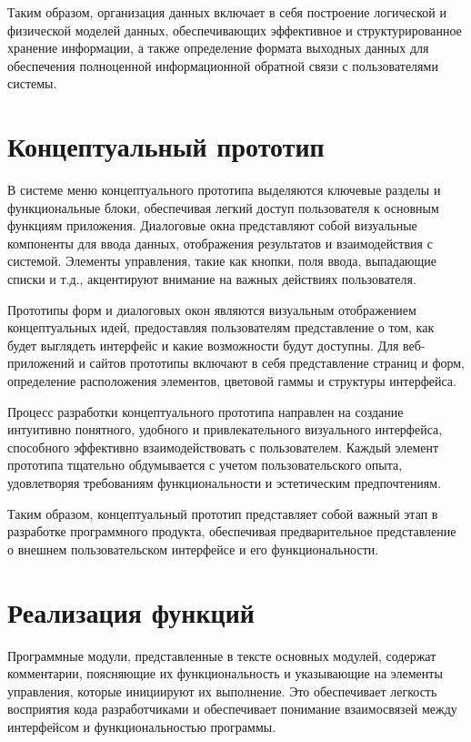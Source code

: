 \documentclass[12pt,a4paper,draft]{belgost/belgost}
\begin{document}
Таким образом, организация данных включает в себя построение логической и физической моделей данных, обеспечивающих эффективное и структурированное хранение информации, а также определение формата выходных данных для обеспечения полноценной информационной обратной связи с пользователями системы.

\section{Концептуальный прототип}

В системе меню концептуального прототипа выделяются ключевые разделы и функциональные блоки, обеспечивая легкий доступ пользователя к основным функциям приложения.
Диалоговые окна представляют собой визуальные компоненты для ввода данных, отображения результатов и взаимодействия с системой.
Элементы управления, такие как кнопки, поля ввода, выпадающие списки и т.д., акцентируют внимание на важных действиях пользователя.

Прототипы форм и диалоговых окон являются визуальным отображением концептуальных идей, предоставляя пользователям представление о том, как будет выглядеть интерфейс и какие возможности будут доступны.
Для веб-приложений и сайтов прототипы включают в себя представление страниц и форм, определение расположения элементов, цветовой гаммы и структуры интерфейса.

Процесс разработки концептуального прототипа направлен на создание интуитивно понятного, удобного и привлекательного визуального интерфейса, способного эффективно взаимодействовать с пользователем.
Каждый элемент прототипа тщательно обдумывается с учетом пользовательского опыта, удовлетворяя требованиям функциональности и эстетическим предпочтениям.

Таким образом, концептуальный прототип представляет собой важный этап в разработке программного продукта, обеспечивая предварительное представление о внешнем пользовательском интерфейсе и его функциональности.

\section{Реализация функций}


Программные модули, представленные в тексте основных модулей, содержат комментарии, поясняющие их функциональность и указывающие на элементы управления, которые инициируют их выполнение.
Это обеспечивает легкость восприятия кода разработчиками и обеспечивает понимание взаимосвязей между интерфейсом и функциональностью программы.
\end{document}

